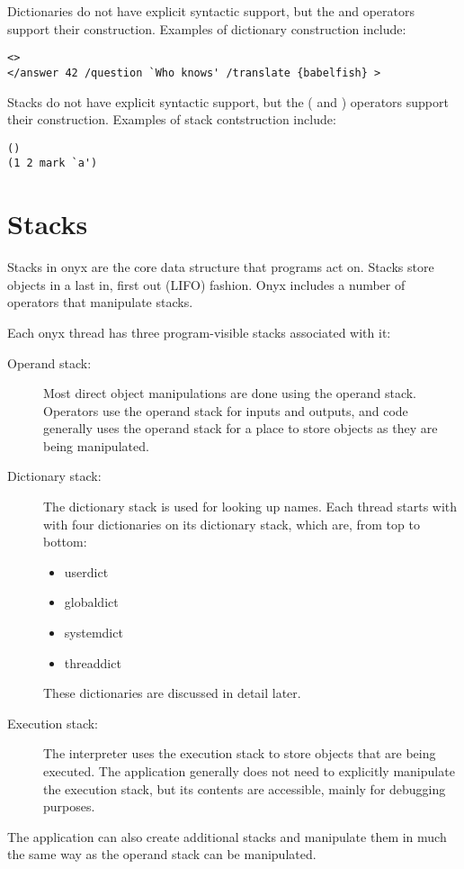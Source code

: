 Dictionaries do not have explicit syntactic support, but the {\lt} and
{\gt} operators support their construction.  Examples of dictionary
construction include:
\begin{verbatim}
<>
</answer 42 /question `Who knows' /translate {babelfish} >
\end{verbatim}

Stacks do not have explicit syntactic support, but the ( and ) operators support
their construction.  Examples of stack contstruction include:
\begin{verbatim}
()
(1 2 mark `a')
\end{verbatim}

\section{Stacks}

Stacks in onyx are the core data structure that programs act on.  Stacks store
objects in a last in, first out (LIFO) fashion.  Onyx includes a number of
operators that manipulate stacks.

Each onyx thread has three program-visible stacks associated with it:
\begin{description}
\item[Operand stack: ] Most direct object manipulations are done using the
	operand stack.  Operators use the operand stack for inputs and outputs,
	and code generally uses the operand stack for a place to store objects
	as they are being manipulated.
\item[Dictionary stack: ] The dictionary stack is used for looking up names.
	Each thread starts with with four dictionaries on its dictionary stack,
	which are, from top to bottom:
	\begin{itemize}
	\item{userdict}
	\item{globaldict}
	\item{systemdict}
	\item{threaddict}
	\end{itemize}
	These dictionaries are discussed in detail later.
\item[Execution stack: ] The interpreter uses the execution stack to store
	objects that are being executed.  The application generally does not
	need to explicitly manipulate the execution stack, but its contents are
	accessible, mainly for debugging purposes.
\end{description}

The application can also create additional stacks and manipulate them in much
the same way as the operand stack can be manipulated.

